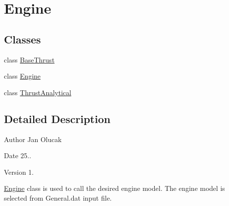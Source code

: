 \hypertarget{group___engine}{}\section{Engine}
\label{group___engine}
\subsection*{Classes}
\begin{DoxyCompactItemize}
\item 
class \hyperlink{class_base_thrust}{Base\+Thrust}
\item 
class \hyperlink{class_engine}{Engine}
\item 
class \hyperlink{class_thrust_analytical}{Thrust\+Analytical}
\end{DoxyCompactItemize}


\subsection{Detailed Description}
\begin{DoxyAuthor}{Author}
Jan Olucak 
\end{DoxyAuthor}
\begin{DoxyDate}{Date}
25.. 
\end{DoxyDate}
\begin{DoxyVersion}{Version}
1.
\end{DoxyVersion}
\hyperlink{class_engine}{Engine} class is used to call the desired engine model. The engine model is selected from General.\+dat input file. 